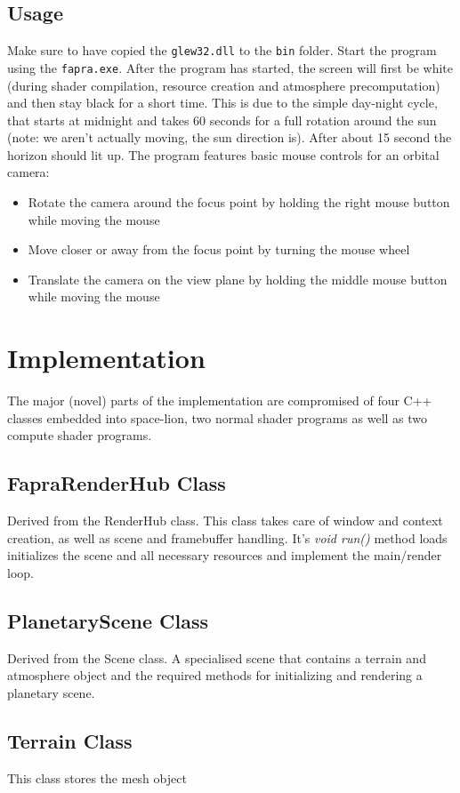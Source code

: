 \documentclass[12pt]{article}
\begin{document}
\subsection*{Usage}
Make sure to have copied the \texttt{glew32.dll} to the \texttt{bin} folder. Start the program using the \texttt{fapra.exe}. After the program has started, the screen will first be white (during shader compilation, resource creation and atmosphere precomputation) and then stay black for a short time. This is due to the simple day-night cycle, that starts at midnight and takes 60 seconds for a full rotation around the sun (note: we aren't actually moving, the sun direction is). After about 15 second the horizon should lit up.\newline
The program features basic mouse controls for an orbital camera:
\begin{itemize}
\item Rotate the camera around the focus point by holding the right mouse button while moving the mouse
\item Move closer or away from the focus point by turning the mouse wheel
\item Translate the camera on the view plane by holding the middle mouse button while moving the mouse
\end{itemize}

\section*{Implementation}
The major (novel) parts of the implementation are compromised of four C++ classes embedded into space-lion, two normal shader programs as well as two compute shader programs.
\subsection*{FapraRenderHub Class}
Derived from the RenderHub class. This class takes care of window and context creation, as well as scene and framebuffer handling. It's \textit{void run()} method loads initializes the scene and all necessary resources and implement the main/render loop.
\subsection*{PlanetaryScene Class}
Derived from the Scene class. A specialised scene that contains a terrain and atmosphere object and the required methods for initializing and rendering a planetary scene.
\subsection*{Terrain Class}
This class stores the mesh object 
\end{document}
